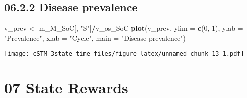 \documentclass[
]{article}
\newenvironment{Shaded}{\begin{snugshade}}{\end{snugshade}}
\newcommand{\AttributeTok}[1]{\textcolor[rgb]{0.13,0.29,0.53}{#1}}
\newcommand{\DecValTok}[1]{\textcolor[rgb]{0.00,0.00,0.81}{#1}}
\newcommand{\FunctionTok}[1]{\textcolor[rgb]{0.13,0.29,0.53}{\textbf{#1}}}
\newcommand{\NormalTok}[1]{#1}
\newcommand{\OtherTok}[1]{\textcolor[rgb]{0.56,0.35,0.01}{#1}}
\newcommand{\SpecialCharTok}[1]{\textcolor[rgb]{0.81,0.36,0.00}{\textbf{#1}}}
\newcommand{\StringTok}[1]{\textcolor[rgb]{0.31,0.60,0.02}{#1}}
\begin{document}
\hypertarget{disease-prevalence}{%
\subsection{06.2.2 Disease prevalence}\label{disease-prevalence}}

\begin{Shaded}
\begin{Highlighting}[]
\NormalTok{v\_prev }\OtherTok{\textless{}{-}}\NormalTok{ m\_M\_SoC[, }\StringTok{"S"}\NormalTok{]}\SpecialCharTok{/}\NormalTok{v\_os\_SoC}
\FunctionTok{plot}\NormalTok{(v\_prev,}
     \AttributeTok{ylim =} \FunctionTok{c}\NormalTok{(}\DecValTok{0}\NormalTok{, }\DecValTok{1}\NormalTok{),}
     \AttributeTok{ylab =} \StringTok{"Prevalence"}\NormalTok{,}
     \AttributeTok{xlab =} \StringTok{"Cycle"}\NormalTok{,}
     \AttributeTok{main =} \StringTok{"Disease prevalence"}\NormalTok{)}
\end{Highlighting}
\end{Shaded}

\texttt{[image: cSTM\_3state\_time\_files/figure-latex/unnamed-chunk-13-1.pdf]}

\hypertarget{state-rewards}{%
\section{07 State Rewards}\label{state-rewards}}
\end{document}
